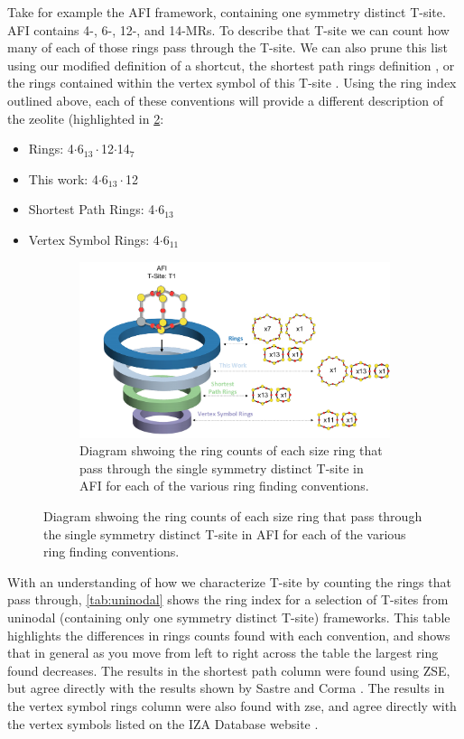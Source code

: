 \documentclass[preprint,numrefs,noinfo,sort&compress]{elsarticle}
\begin{document}
Take for example the AFI framework, containing one symmetry distinct T-site. AFI contains 4-, 6-, 12-, and 14-MRs. To describe that T-site we can count how many of each of those rings pass through the T-site. We can also prune this list using our modified definition of a shortcut, the shortest path rings definition \cite{sastre-topological-2009}, or the rings contained within the vertex symbol of this T-site \cite{okeeffe-vertex-1997}. Using the ring index outlined above, each of these conventions will provide a different description of the zeolite (highlighted in \cref{fig:afi-funnel}:
\begin{itemize}
\item Rings: 4\(\cdot\)6\(_{\text{13}} \cdot\)12\(\cdot\)14\(_{\text{7}}\)
\item This work: 4\(\cdot\)6\(_{\text{13}} \cdot\)12
\item Shortest Path Rings: 4\(\cdot\)6\(_{\text{13}}\)
\item Vertex Symbol Rings: 4\(\cdot\)6\(_{\text{11}}\)
\end{itemize}

\begin{figure}
\begin{figure}[H]
\centering
\includegraphics[width=\textwidth]{figures/chapter-3/afi-funnel.pdf}
\caption{Diagram shwoing the ring counts of each size ring that pass through the single symmetry distinct T-site in AFI for each of the various ring finding conventions. \label{fig:afi-funnel}}
\end{figure}
\end{figure}

With an understanding of how we characterize T-site by counting the rings that pass through, \cref{tab:uninodal} shows the ring index for a selection of T-sites from uninodal (containing only one symmetry distinct T-site) frameworks. This table highlights the differences in rings counts found with each convention, and shows that in general as you move from left to right across the table the largest ring found decreases. The results in the shortest path column were found using ZSE, but agree directly with the results shown by Sastre and Corma \cite{sastre-topological-2009}. The results in the vertex symbol rings column were also found with zse, and agree directly with the vertex symbols listed on the IZA Database website \cite{baerlocher-database-nodate}.  
\end{document}
